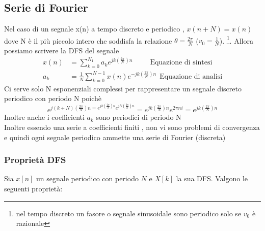 \documentclass{article}
\theoremstyle{definition}
\begin{document}
	\subsection{Serie di Fourier}
	Nel caso di un segnale x(n) a tempo discreto e periodico , $x(n+N)=x(n)$ dove N è il più piccolo intero che soddisfa la relazione $\theta=\frac{2\pi}{N}$ ($v_0=\frac{1}{N}$). \footnote{nel tempo discreto un fasore o segnale sinusoidale sono periodico solo se $v_0$ è razionale}.
	Allora possiamo scrivere la DFS del segnale 
	\begin{align*}
		x(n)&=\sum_{k=0}^{N_1} a_k e^{jk\left(\frac{2 \pi }{N}\right)n} \ \ \ \ \ \ \ \ \ \ \ \text{Equazione di sintesi}\\
		a_k&=\frac{1}{N} \sum_{k=0}^{N-1}x(n)e^{-jk\left(\frac{2 \pi }{N}\right)n}  \ \ \text{Equazione di analisi}
	\end{align*}
	Ci serve solo N esponenziali complessi per rappresentare un segnale discreto periodico con periodo N poichè 
	$$e^{j(k+N)\left(\frac{2 \pi }{N}\right)n=e^{jk\left(\frac{2 \pi }{N}\right)n} e^{jN\left(\frac{2 \pi }{N}\right)n} } =e^{jk\left(\frac{2 \pi }{N}\right)n} e^{2 \pi n i} =e^{jk\left(\frac{2 \pi }{N}\right)n} $$
	Inoltre anche i coefficienti $a_k$ sono periodici di periodo N \\
	Inoltre essendo una serie a coefficienti finiti , non vi sono problemi di convergenza e quindi ogni segnale periodico ammette una serie di Fourier (discreta)
	\subsubsection{Proprietà DFS}
	Sia \(x[n]\) un segnale periodico con periodo \(N\) e \(X[k]\) la sua DFS. Valgono le seguenti proprietà:
	
\end{document}

